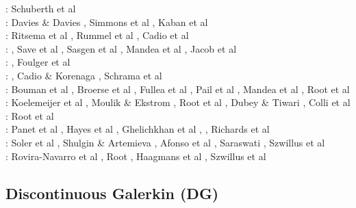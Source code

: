 \begin{scriptsize}
\twothousandnine: Schuberth et al \cite{scbr09}\\
\twothousandten: Davies \& Davies \cite{dada10}, Simmons et al \cite{sifb10}, Kaban et al \cite{katc10}\\
\twothousandeleven: Ritsema et al \cite{ridv11}, Rummel et al \cite{ruys11}, Cadio et al \cite{capd11}\\
\twothousandtwelve: \cite{hawj12}\cite{resa12}\cite{hawj12}\cite{fesw12}\cite{simj12}\cite{beck12}\cite{pahk12}, Save et al \cite{sabt12}, Sasgen et al \cite{sakm12}, Mandea et al \cite{mapl12}, Jacob et al \cite{jawp12}\\
\twothousandthirteen: \cite{ress13}\cite{ebbf13}\cite{davi13}\cite{scle13}\cite{waja13}, Foulger et al \cite{fopa13}\\
\twothousandfourteen: \cite{paml14}\cite{ebbf14}\cite{krbk14}\cite{licl14}\cite{aubb14}, 
Cadio \& Korenaga \cite{cako14}, Schrama et al \cite{scwr14}\\
\twothousandfifteen: Bouman et al \cite{boem15}, Broerse et al \cite{brrs15}, Fullea et al \cite{furc15}, Pail et al \cite{pabb15},
Mandea et al \cite{manp15}, Root et al \cite{rotv15}\\
\twothousandsixteen: Koelemeijer et al \cite{kord16}, Moulik \& Ekstrom \cite{moek16}, Root et al \cite{rond16}, 
Dubey \& Tiwari \cite{duti16}, Colli et al \cite{cogb16}\\
\twothousandseventeen: Root et al \cite{roev17}\\
\twothousandeighteen: Panet et al \cite{pabn18}, Hayes et al \cite{hamp18}, Ghelichkhan et al \cite{ghmc18}, \cite{homs18}, Richards et al \cite{rihc18}\\
\twothousandnineteen: Soler et al \cite{sopg19}, Shulgin \& Artemieva \cite{shar19}, Afonso et al \cite{afss19}, 
Saraswati \cite{sacm19}, Szwillus et al \cite{szae19}\\
\twothousandtwenty: Rovira-Navarro et al \cite{rovb20}, Root \cite{root20}, Haagmans et al \cite{hasm20}, Szwillus et al \cite{szes20}
\end{scriptsize}

\subsection{Discontinuous Galerkin (DG)}

